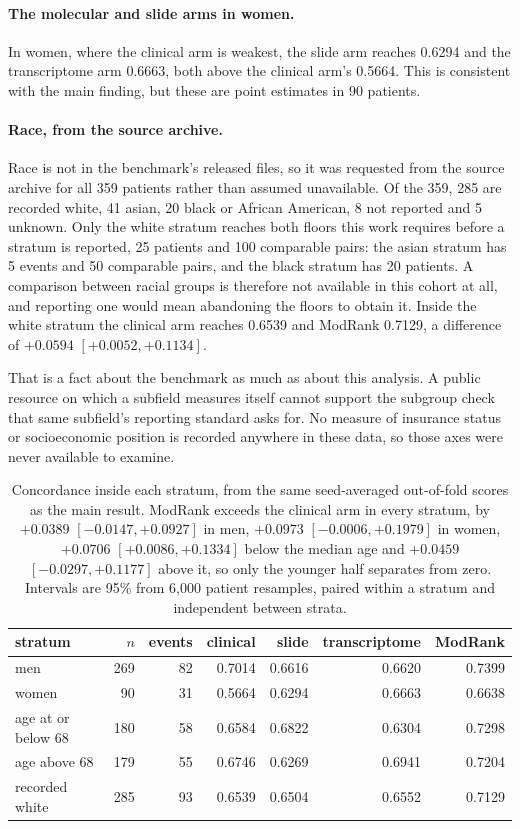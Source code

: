 \documentclass[11pt]{article}
\begin{document}
\paragraph{The molecular and slide arms in women.} In women, where the clinical arm is weakest, the
slide arm reaches 0.6294 and the transcriptome arm 0.6663, both above the clinical arm's 0.5664. This
is consistent with the main finding, but these are point estimates in 90 patients.

\paragraph{Race, from the source archive.} Race is not in the
benchmark's released files, so it was requested from the source archive for all 359 patients rather
than assumed unavailable. Of the 359, 285 are recorded white, 41
asian, 20 black or African American, 8 not reported and 5 unknown. Only the white stratum reaches
both floors this work requires before a stratum is reported, 25 patients and 100 comparable pairs:
the asian stratum has 5 events and 50 comparable pairs, and the black stratum has 20 patients. A
comparison between racial groups is therefore not available in this cohort at all, and reporting one
would mean abandoning the floors to obtain it. Inside the white stratum the clinical arm reaches
0.6539 and ModRank 0.7129, a difference of $+0.0594$ $[+0.0052, +0.1134]$.

That is a fact about the benchmark as much as about this analysis. A public resource on which a
subfield measures itself cannot support the subgroup check that same subfield's reporting standard
asks for. No measure of insurance status or socioeconomic position is recorded anywhere in these
data, so those axes were never available to examine.

\begin{table}[h]
\centering
{\small
\setlength{\tabcolsep}{4pt}
\begin{tabular}{lrrrrrr}
\toprule
stratum & $n$ & events & clinical & slide & transcriptome & ModRank \\
\midrule
men & 269 & 82 & 0.7014 & 0.6616 & 0.6620 & 0.7399 \\
women & 90 & 31 & 0.5664 & 0.6294 & 0.6663 & 0.6638 \\
age at or below 68 & 180 & 58 & 0.6584 & 0.6822 & 0.6304 & 0.7298 \\
age above 68 & 179 & 55 & 0.6746 & 0.6269 & 0.6941 & 0.7204 \\
recorded white & 285 & 93 & 0.6539 & 0.6504 & 0.6552 & 0.7129 \\
\bottomrule
\end{tabular}}
\caption{Concordance inside each stratum, from the same seed-averaged out-of-fold scores as the main
result. ModRank exceeds the clinical arm in every stratum, by $+0.0389$ $[-0.0147, +0.0927]$ in men,
$+0.0973$ $[-0.0006, +0.1979]$ in women, $+0.0706$ $[+0.0086, +0.1334]$ below the median age and
$+0.0459$ $[-0.0297, +0.1177]$ above it, so only the younger half separates from zero. Intervals are
95\% from 6,000 patient resamples, paired within a stratum and independent between strata.}
\label{tab:subgroup}
\end{table}
\end{document}
